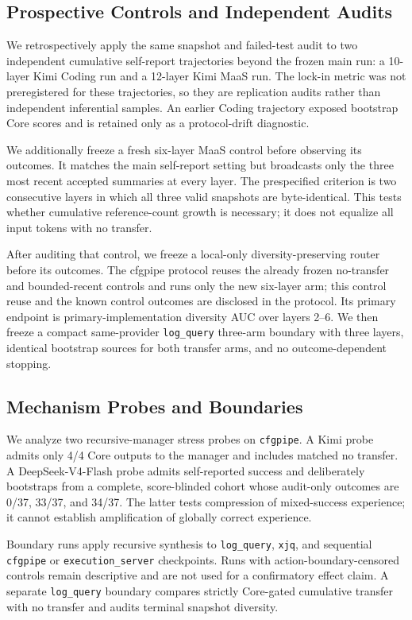 \documentclass[letterpaper]{article}
\begin{document}
\subsection{Prospective Controls and Independent Audits}

We retrospectively apply the same snapshot and failed-test audit to two
independent cumulative self-report trajectories beyond the frozen main run: a
10-layer Kimi Coding run and a 12-layer Kimi MaaS run. The lock-in metric was not
preregistered for these trajectories, so they are replication audits rather than
independent inferential samples. An earlier Coding trajectory exposed bootstrap
Core scores and is retained only as a protocol-drift diagnostic.

We additionally freeze a fresh six-layer MaaS control before observing its
outcomes. It matches the main self-report setting but broadcasts only the three
most recent accepted summaries at every layer. The prespecified criterion is two
consecutive layers in which all three valid snapshots are byte-identical. This
tests whether cumulative reference-count growth is necessary; it does not
equalize all input tokens with no transfer.

After auditing that control, we freeze a local-only diversity-preserving router
before its outcomes. The cfgpipe protocol reuses the already frozen no-transfer
and bounded-recent controls and runs only the new six-layer arm; this control reuse
and the known control outcomes are disclosed in the protocol. Its primary endpoint
is primary-implementation diversity AUC over layers 2--6. We then freeze a compact
same-provider \texttt{log\_query} three-arm boundary with three layers, identical
bootstrap sources for both transfer arms, and no outcome-dependent stopping.

\subsection{Mechanism Probes and Boundaries}

We analyze two recursive-manager stress probes on \texttt{cfgpipe}. A Kimi probe
admits only 4/4 Core outputs to the manager and includes matched no transfer. A
DeepSeek-V4-Flash probe admits self-reported success and deliberately bootstraps
from a complete, score-blinded cohort whose audit-only outcomes are 0/37, 33/37,
and 34/37. The latter tests compression of mixed-success experience; it cannot
establish amplification of globally correct experience.

Boundary runs apply recursive synthesis to \texttt{log\_query}, \texttt{xjq},
and sequential \texttt{cfgpipe} or \texttt{execution\_server} checkpoints.
Runs with action-boundary-censored controls remain descriptive and are not used
for a confirmatory effect claim. A separate \texttt{log\_query} boundary compares
strictly Core-gated cumulative transfer with no transfer and audits terminal
snapshot diversity.
\end{document}
